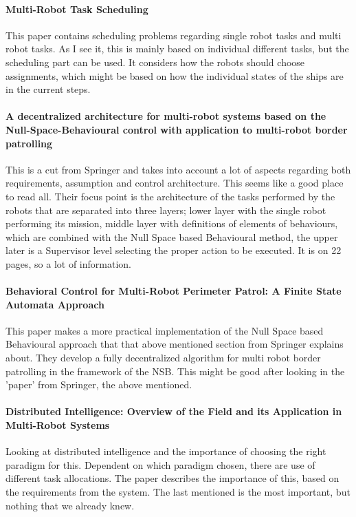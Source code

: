 \paragraph{Multi-Robot Task Scheduling}
This paper contains scheduling problems regarding single robot tasks and multi robot tasks. As I see it, this is mainly based on individual different tasks, but the scheduling part can be used. It considers how the robots should choose assignments, which might be based on how the individual states of the ships are in the current steps.

\paragraph{A decentralized architecture for multi-robot systems based on the Null-Space-Behavioural control with application to multi-robot border patrolling}
This is a cut from Springer and takes into account a lot of aspects regarding both requirements, assumption and control architecture. This seems like a good place to read all. Their focus point is the architecture of the tasks performed by the robots that are separated into three layers; lower layer with the single robot performing its mission, middle layer with definitions of elements of behaviours, which are combined with the Null Space based Behavioural method, the upper later is a Supervisor level selecting the proper action to be executed. It is on 22 pages, so a lot of information.

\paragraph{Behavioral Control for Multi-Robot Perimeter Patrol: A Finite State Automata Approach}
This paper makes a more practical implementation of the Null Space based Behavioural approach that that above mentioned section from Springer explains about. They develop a fully decentralized algorithm for multi robot border patrolling in the framework of the NSB.
This might be good after looking in the 'paper' from Springer, the above mentioned.

\paragraph{Distributed Intelligence: Overview of the Field and its Application in Multi-Robot Systems}
Looking at distributed intelligence and the importance of choosing the right paradigm for this. Dependent on which paradigm chosen, there are use of different task allocations. The paper describes the importance of this, based on the requirements from the system.
The last mentioned is the most important, but nothing that we already knew.

